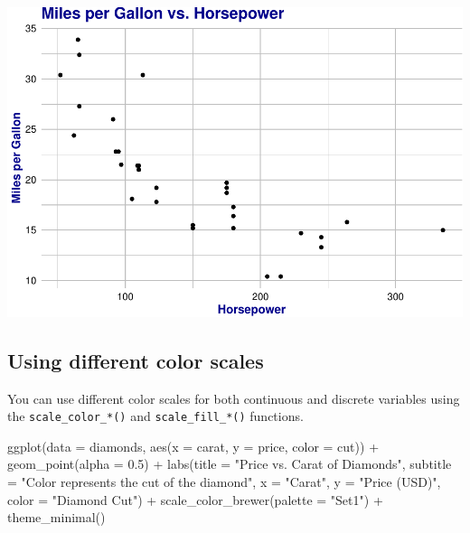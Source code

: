 \documentclass[
]{book}
\newenvironment{Shaded}{\begin{snugshade}}{\end{snugshade}}
\newcommand{\AttributeTok}[1]{\textcolor[rgb]{0.77,0.63,0.00}{#1}}
\newcommand{\FloatTok}[1]{\textcolor[rgb]{0.00,0.00,0.81}{#1}}
\newcommand{\FunctionTok}[1]{\textcolor[rgb]{0.00,0.00,0.00}{#1}}
\newcommand{\NormalTok}[1]{#1}
\newcommand{\SpecialCharTok}[1]{\textcolor[rgb]{0.00,0.00,0.00}{#1}}
\newcommand{\StringTok}[1]{\textcolor[rgb]{0.31,0.60,0.02}{#1}}
\begin{document}
\includegraphics[width=1\linewidth]{graphformatting_files/figure-latex/unnamed-chunk-4-1}

\hypertarget{using-different-color-scales}{%
\subsection{Using different color scales}\label{using-different-color-scales}}

You can use different color scales for both continuous and discrete variables using the \texttt{scale\_color\_*()} and \texttt{scale\_fill\_*()} functions.

\begin{Shaded}
\begin{Highlighting}[]
\FunctionTok{ggplot}\NormalTok{(}\AttributeTok{data =}\NormalTok{ diamonds, }\FunctionTok{aes}\NormalTok{(}\AttributeTok{x =}\NormalTok{ carat, }\AttributeTok{y =}\NormalTok{ price, }\AttributeTok{color =}\NormalTok{ cut)) }\SpecialCharTok{+}
  \FunctionTok{geom\_point}\NormalTok{(}\AttributeTok{alpha =} \FloatTok{0.5}\NormalTok{) }\SpecialCharTok{+}
  \FunctionTok{labs}\NormalTok{(}\AttributeTok{title =} \StringTok{"Price vs. Carat of Diamonds"}\NormalTok{,}
       \AttributeTok{subtitle =} \StringTok{"Color represents the cut of the diamond"}\NormalTok{,}
       \AttributeTok{x =} \StringTok{"Carat"}\NormalTok{,}
       \AttributeTok{y =} \StringTok{"Price (USD)"}\NormalTok{,}
       \AttributeTok{color =} \StringTok{"Diamond Cut"}\NormalTok{) }\SpecialCharTok{+}
  \FunctionTok{scale\_color\_brewer}\NormalTok{(}\AttributeTok{palette =} \StringTok{"Set1"}\NormalTok{) }\SpecialCharTok{+}
  \FunctionTok{theme\_minimal}\NormalTok{()}
\end{Highlighting}
\end{Shaded}
\end{document}

